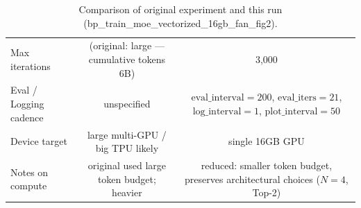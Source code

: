 \documentclass{article}
\begin{document}
\begin{table}[h!]
\begin{tabular}{@{}lcc@{}}
Max iterations & (original: large — cumulative tokens 6B) & 3,000 \\
Eval / Logging cadence & unspecified & $\text{eval\_interval}=200$, $\text{eval\_iters}=21$, $\text{log\_interval}=1$, $\text{plot\_interval}=50$ \\
Device target & large multi-GPU / big TPU likely & single 16GB GPU \\
Notes on compute & original used large token budget; heavier & reduced: smaller token budget, preserves architectural choices ($N=4$, Top-2) \\
\bottomrule
\end{tabular}
\caption{Comparison of original experiment and this run (bp\_train\_moe\_vectorized\_16gb\_fan\_fig2).}
\end{table}
\end{document}
